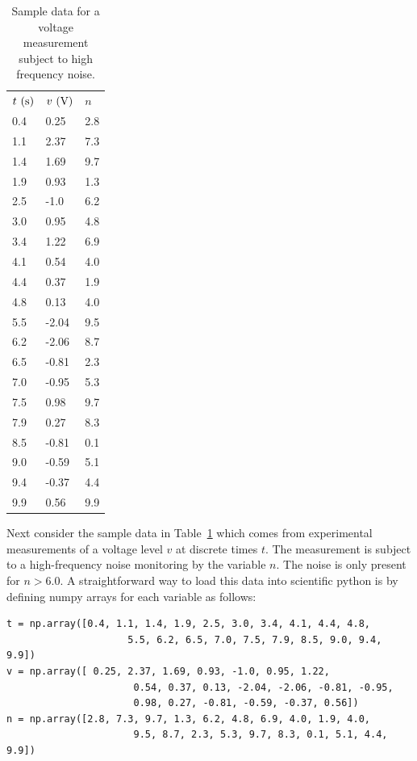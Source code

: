 \begin{table}
\caption{Sample data for a voltage measurement subject to high frequency noise.}
\label{tbl:hfnoiseeg}
\begin{center}
\begin{tabular}{lll}
$t~(\rm s)$ & $v~(\rm V)$ & $n$ \\
0.4  & 0.25  &  2.8 \\
1.1  & 2.37  &  7.3 \\
1.4  & 1.69  &  9.7 \\
1.9  & 0.93  &  1.3 \\
2.5  & -1.0  &  6.2 \\
3.0  & 0.95  &  4.8 \\
3.4  & 1.22  &  6.9 \\
4.1  & 0.54  &  4.0 \\
4.4  & 0.37  &  1.9 \\
4.8  & 0.13  &  4.0 \\
5.5  & -2.04  &  9.5 \\
6.2  & -2.06  &  8.7 \\
6.5  & -0.81  &  2.3 \\
7.0  & -0.95  &  5.3 \\
7.5  & 0.98  &  9.7 \\
7.9  & 0.27  &  8.3 \\
8.5  & -0.81  &  0.1 \\
9.0  & -0.59  &  5.1 \\
9.4  & -0.37  &  4.4 \\
9.9  & 0.56  &  9.9 \\
\end{tabular}
\end{center}
\end{table}

Next consider the sample data in Table~\ref{tbl:hfnoiseeg} which comes from experimental measurements of a voltage level $v$ at discrete times $t$.  The measurement is subject to a high-frequency noise monitoring by the variable $n$.  The noise is only present for $n > 6.0$.  A straightforward way to load this data into scientific python is by defining numpy arrays for each variable as follows:
\begin{verbatim}
t = np.array([0.4, 1.1, 1.4, 1.9, 2.5, 3.0, 3.4, 4.1, 4.4, 4.8, 
                     5.5, 6.2, 6.5, 7.0, 7.5, 7.9, 8.5, 9.0, 9.4, 9.9])
v = np.array([ 0.25, 2.37, 1.69, 0.93, -1.0, 0.95, 1.22,   
                      0.54, 0.37, 0.13, -2.04, -2.06, -0.81, -0.95,  
                      0.98, 0.27, -0.81, -0.59, -0.37, 0.56])
n = np.array([2.8, 7.3, 9.7, 1.3, 6.2, 4.8, 6.9, 4.0, 1.9, 4.0,  
                      9.5, 8.7, 2.3, 5.3, 9.7, 8.3, 0.1, 5.1, 4.4, 9.9])
\end{verbatim}

